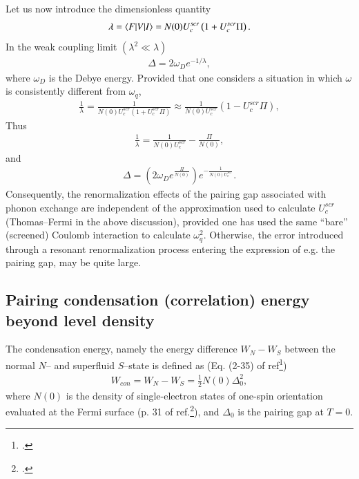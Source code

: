 \begin{subappendices}
Let us now introduce the dimensionless quantity
\begin{align}\label{eqC2AppA25}
\lambda=\langle {F|V|I} \rangle=N(0)U^{scr}_c\left(1+U^{scr}_c\Pi\right).
\end{align}
In the weak coupling limit $(\lambda^2\ll\lambda)$
\begin{align}\label{eqC2AppA26}
\Delta=2\omega_De^{-1/\lambda},
\end{align}
where $\omega_D$ is the Debye energy.
  Provided that one considers  a situation in which $\omega$ is consistently different from $\omega_q$,
\begin{align}\label{eqC2AppA28}
\frac{1}{\lambda}=\frac{1}{N(0)U^{scr}_c\left(1+U^{scr}_c\Pi\right)}\approx\frac{1}{N(0)U^{scr}_c}\left(1-U^{scr}_c\Pi\right),
\end{align}
Thus
\begin{align}\label{eqC2AppA29}
\frac{1}{\lambda}=\frac{1}{N(0)U^{scr}_c}-\frac{\Pi}{N(0)},
\end{align}
and
\begin{align}\label{eqC2AppA30}
\Delta=\left(2\omega_De^{\frac{\Pi}{N(0)}}\right)e^{-\frac{1}{N(0)U^{scr}_c}}.
\end{align}
Consequently, the renormalization effects of the pairing gap associated with phonon exchange are independent of the approximation used to calculate $U^{scr}_c$ (Thomas--Fermi in the above discussion), provided one has used the same ``bare'' (screened) Coulomb interaction to calculate $\omega^2_q$.   Otherwise, the error introduced through a resonant renormalization process entering the expression of e.g. the pairing gap, may be quite large.
\subsection{Pairing condensation (correlation) energy beyond level density}



The condensation energy, namely the energy difference $W_N-W_S$ between the normal $N$-- and superfluid $S$--state is defined as (Eq. (2-35) of ref\footnote{\label{foot1}\cite{Schrieffer:64}.})
\begin{align}\label{eqC3AppA1}
W_{con}=W_N-W_S=\frac{1}{2}N(0)\Delta_0^2,
\end{align}
where $N(0)$ is the density of single-electron states of one-spin orientation evaluated at the Fermi surface (p. 31 of ref.\footnote{\cite{Schrieffer:64}.}), and $\Delta_0$ is the pairing gap at $T=0$.



\end{subappendices}

